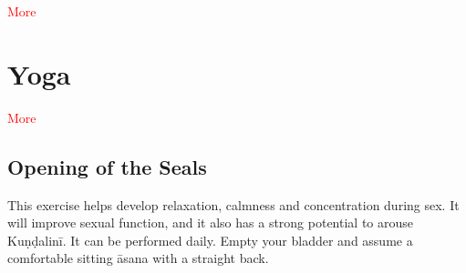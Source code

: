 \documentclass[a4paper,14pt]{memoir}
\newcommand{\asana}{āsana}
\newcommand{\kundalini}{Kuṇḍalinī}
\newcommand{\cmmnt}[1]{\textcolor{red}{#1}}
\begin{document}
\cmmnt{More}

\section{Yoga}

\cmmnt{More}

\subsection{Opening of the Seals}

This exercise helps develop relaxation, calmness and concentration during sex. It will improve sexual function, and it also has a strong potential to arouse \kundalini{}. It can be performed daily. Empty your bladder and assume a comfortable sitting \asana{} with a straight back.
\end{document}
